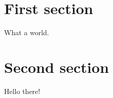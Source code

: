 \usepackage{titleps}


\pagestyle{main}


\section{First section}
What a world.

\section{Second section}
Hello there!

